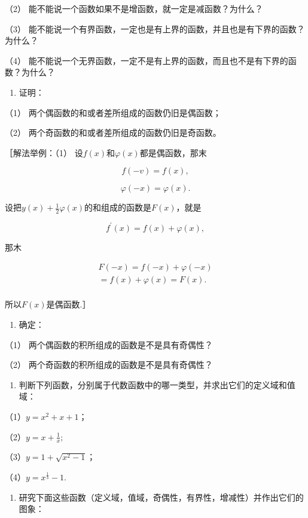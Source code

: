 （2） 能不能说一个函数如果不是增函数，就一定是减函数？为什么？

（3）
能不能说一个有界函数，一定也是有上界的函数，并且也是有下界的函数？为什么？

（4）
能不能说一个无界函数，一定不是有上界的函数，而且也不是有下界的函数？为什么？

\begin{enumerate}[start=2]
\item
  证明：
\end{enumerate}

（1） 两个偶函数的和或者差所组成的函数仍旧是偶函数；

（2） 两个奇函数的和或者差所组成的函数仍旧是奇函数。

［解法举例：（1） 设\(f(x)\)和\(\varphi(x)\)都是偶函数，那末

\[
f (- v) = f (x),
\]

\[
\varphi (- x) = \varphi (x).
\]

设把\(y(x) + \frac{1}{2}\varphi (x)\)的和组成的函数是\(F(x)\)，就是

\[
f^{\prime} (x) = f (x) + \varphi (x),
\]

那木

\[
\begin{array}{l} F (- x) = f (- x) + \varphi (- x) \\ = f (x) + \varphi (x) = F (x). \\ \end{array}
\]

所以\(F(x)\)是偶函数.］

\begin{enumerate}[start=3]
\item
  确定：
\end{enumerate}

（1） 两个偶函数的积所组成的函数是不是具有奇偶性？

（2） 两个奇函数的积所组成的函数是不是具有奇偶性？

\begin{enumerate}[start=4]
\item
  判断下列函数，分别属于代数函数中的哪一类型，并求出它们的定义域和值域：
\end{enumerate}

（1）\(y = x^{2} + x + 1\)；

（2）\(y = x + \frac{1}{x};\)

（3）\(y = 1 + \sqrt{x^2 - 1}\)；

（4）\(y = x^{\frac{1}{3}} - 1.\)

\begin{enumerate}[start=5]
\item
  研究下面这些函数（定义域，值域，奇偶性，有界性，增减性）并作出它们的图象：
\end{enumerate}

